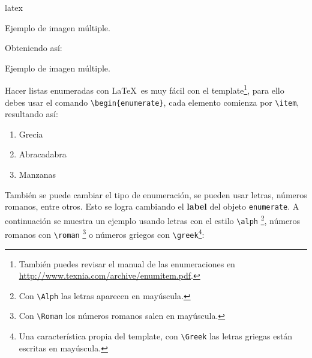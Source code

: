 \begin{sourcecode}{latex}{}
\begin{images}[\label{imagenmultiple}]{Ejemplo de imagen múltiple.}
	\imagesnewline
\end{images}
\end{sourcecode}

	Obteniendo así:

	\begin{images}{Ejemplo de imagen múltiple.}
		\imagesnewline
	\end{images}




		Hacer listas enumeradas con \LaTeX\ es muy fácil con el template\footnote{También puedes revisar el manual de las enumeraciones en \url{http://www.texnia.com/archive/enumitem.pdf}.}, para ello debes usar el comando \texttt{\textbackslash begin\{enumerate\}}, cada elemento comienza por \texttt{\textbackslash item}, resultando así:

		\begin{enumerate}
			\item Grecia
			\item Abracadabra
			\item Manzanas
		\end{enumerate}

		También se puede cambiar el tipo de enumeración, se pueden usar letras, números romanos, entre otros. Esto se logra cambiando el \textbf{label} del objeto \texttt{enumerate}. A continuación se muestra un ejemplo usando letras con el estilo \texttt{\textbackslash alph} \footnote{Con \texttt{\textbackslash Alph} las letras aparecen en mayúscula.}, números romanos con \texttt{\textbackslash roman} \footnote{Con \texttt{\textbackslash Roman} los números romanos salen en mayúscula.} o números griegos con \texttt{\textbackslash greek}\footnote{Una característica propia del template, con \texttt{\textbackslash Greek} las letras griegas están escritas en mayúscula.}:

